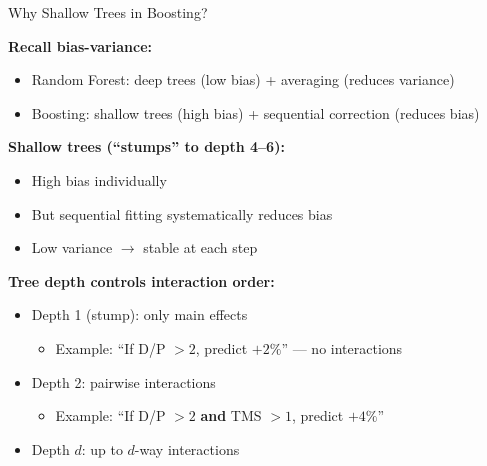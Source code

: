 \documentclass[10pt]{beamer}
\begin{document}
\begin{frame}{Why Shallow Trees in Boosting?}

  \textbf{Recall bias-variance:}
  \begin{itemize}
    \item Random Forest: deep trees (low bias) + averaging (reduces variance)
    \item Boosting: shallow trees (high bias) + sequential correction (reduces bias)
  \end{itemize}

  \vspace{0.5em}
  \textbf{Shallow trees (``stumps'' to depth 4--6):}
  \begin{itemize}
    \item High bias individually
    \item But sequential fitting systematically reduces bias
    \item Low variance $\rightarrow$ stable at each step
  \end{itemize}

  \vspace{0.5em}
  \textbf{Tree depth controls interaction order:}
  \begin{itemize}
    \item Depth 1 (stump): only main effects
    \begin{itemize}
      \item Example: ``If D/P $> 2$, predict $+2\%$'' --- no interactions
    \end{itemize}
    \item Depth 2: pairwise interactions
    \begin{itemize}
      \item Example: ``If D/P $> 2$ \textbf{and} TMS $> 1$, predict $+4\%$''
    \end{itemize}
    \item Depth $d$: up to $d$-way interactions
  \end{itemize}

\end{frame}

\end{document}
